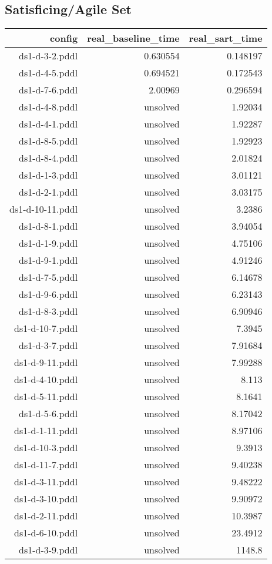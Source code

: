 \documentclass{article}
\begin{document}
                    \subsection*{Satisficing/Agile Set}
                    
                            \begin{center}
                            \scriptsize
                            \begin{tabular}{r|r|r}
                            config & real\_baseline\_time & real\_sart\_time\\\midrule
                             ds1-d-3-2.pddl&0.630554&0.148197\\
 ds1-d-4-5.pddl&0.694521&0.172543\\
 ds1-d-7-6.pddl&2.00969&0.296594\\
 ds1-d-4-8.pddl&unsolved&1.92034\\
 ds1-d-4-1.pddl&unsolved&1.92287\\
 ds1-d-8-5.pddl&unsolved&1.92923\\
 ds1-d-8-4.pddl&unsolved&2.01824\\
 ds1-d-1-3.pddl&unsolved&3.01121\\
 ds1-d-2-1.pddl&unsolved&3.03175\\
 ds1-d-10-11.pddl&unsolved&3.2386\\
 ds1-d-8-1.pddl&unsolved&3.94054\\
 ds1-d-1-9.pddl&unsolved&4.75106\\
 ds1-d-9-1.pddl&unsolved&4.91246\\
 ds1-d-7-5.pddl&unsolved&6.14678\\
 ds1-d-9-6.pddl&unsolved&6.23143\\
 ds1-d-8-3.pddl&unsolved&6.90946\\
 ds1-d-10-7.pddl&unsolved&7.3945\\
 ds1-d-3-7.pddl&unsolved&7.91684\\
 ds1-d-9-11.pddl&unsolved&7.99288\\
 ds1-d-4-10.pddl&unsolved&8.113\\
 ds1-d-5-11.pddl&unsolved&8.1641\\
 ds1-d-5-6.pddl&unsolved&8.17042\\
 ds1-d-1-11.pddl&unsolved&8.97106\\
 ds1-d-10-3.pddl&unsolved&9.3913\\
 ds1-d-11-7.pddl&unsolved&9.40238\\
 ds1-d-3-11.pddl&unsolved&9.48222\\
 ds1-d-3-10.pddl&unsolved&9.90972\\
 ds1-d-2-11.pddl&unsolved&10.3987\\
 ds1-d-6-10.pddl&unsolved&23.4912\\
 ds1-d-3-9.pddl&unsolved&1148.8
                            \end{tabular}
                            \end{center}
                    
\end{document}

